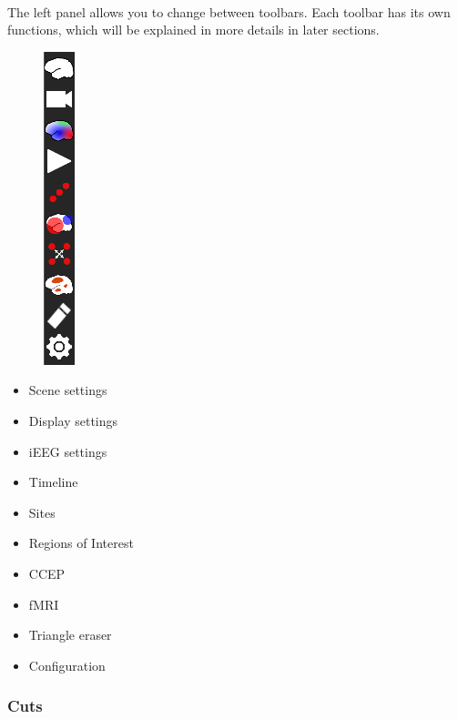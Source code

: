 \documentclass[a4paper]{article}
\begin{document}
\paragraph{} The left panel allows you to change between toolbars. Each toolbar has its own functions, which will be explained in more details in later sections.
\newline
\begin{minipage}{0.2\textwidth}
\begin{figure}[H]
\begin{center}
\includegraphics[scale=0.75]{ToolbarSelector.png}
\end{center}
\end{figure}
\end{minipage}
\begin{minipage}{0.5\textwidth}
\begin{itemize}
\item Scene settings
\item Display settings
\item iEEG settings
\item Timeline
\item Sites
\item Regions of Interest
\item CCEP
\item fMRI
\item Triangle eraser
\item Configuration
\end{itemize}
\end{minipage}
\subsubsection{Cuts}\label{cuts}
\end{document}
